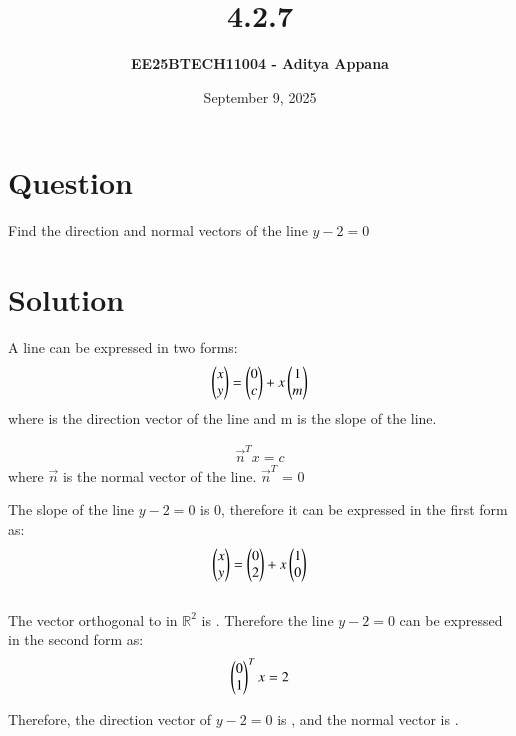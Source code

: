 \documentclass[12pt]{article}
\title{\textbf{4.2.7}}
\author{\textbf{EE25BTECH11004 - Aditya Appana}}
\date{September 9, 2025}
\begin{document}
\maketitle

\section*{Question}
Find the direction and normal vectors of the line $y-2=0$

\section*{Solution}
A line can be expressed in two forms:
\begin{align}
\begin{pmatrix}x\\y\end{pmatrix} = \begin{pmatrix}0\\c\end{pmatrix} + x\begin{pmatrix}1\\m\end{pmatrix}
\end{align}
where  is the direction vector of the line and m is the slope of the line.

\begin{align}
{\vec{n}}^{T}x = c
\end{align}
where $\vec{n}$ is the normal vector of the line. ${\vec{n}}^T$ = 0

\vspace{1cm}

The slope of the line $y-2=0$ is 0, therefore it can be expressed in the first form as:
\begin{align}
\begin{pmatrix}x\\y\end{pmatrix} = \begin{pmatrix}0\\2\end{pmatrix} + x\begin{pmatrix}1\\0\end{pmatrix}
\end{align}\\

The vector orthogonal to  in $\mathbb{R}^2$ is . Therefore the line $y-2=0$ can be expressed in the second form as:
\begin{align}
\begin{pmatrix}0\\1\end{pmatrix}^Tx=2
\end{align}

\vspace{1cm}


Therefore, the direction vector of $y-2=0$ is  , and the normal vector is .
\end{document}
